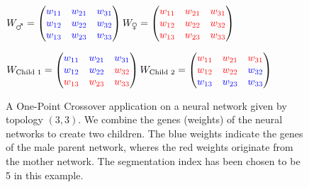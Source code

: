 \documentclass[10pt,a4paper,DIV=11]{scrreprt}
\begin{document}
\begin{figure}
    \begin{center}
        $
        W_{\mars} = 
        \begin{pmatrix}
        \textcolor{blue}{w_{11}} & \textcolor{blue}{w_{21}} & \textcolor{blue}{w_{31}} \\
        \textcolor{blue}{w_{12}} & \textcolor{blue}{w_{22}} & \textcolor{blue}{w_{32}} \\
        \textcolor{blue}{w_{13}} & \textcolor{blue}{w_{23}} & \textcolor{blue}{w_{33}} \\
        \end{pmatrix}
        W_{\female} = 
        \begin{pmatrix}
        \textcolor{red}{w_{11}} & \textcolor{red}{w_{21}} & \textcolor{red}{w_{31}} \\
        \textcolor{red}{w_{12}} & \textcolor{red}{w_{22}} & \textcolor{red}{w_{32}} \\
        \textcolor{red}{w_{13}} & \textcolor{red}{w_{23}} & \textcolor{red}{w_{33}} \\
        \end{pmatrix}
        $
            
        \end{center}

        \begin{center}
        $
        W_{\text{Child 1}} = 
        \begin{pmatrix}
        \textcolor{blue}{w_{11}} & \textcolor{blue}{w_{21}} & \textcolor{blue}{w_{31}} \\
        \textcolor{blue}{w_{12}} & \textcolor{blue}{w_{22}} & \textcolor{red}{w_{32}} \\
        \textcolor{red}{w_{13}} & \textcolor{red}{w_{23}} & \textcolor{red}{w_{33}} \\
        \end{pmatrix}
        W_{\text{Child 2}} = 
        \begin{pmatrix}
        \textcolor{red}{w_{11}} & \textcolor{red}{w_{21}} & \textcolor{red}{w_{31}} \\
        \textcolor{red}{w_{12}} & \textcolor{red}{w_{22}} & \textcolor{blue}{w_{32}} \\
        \textcolor{blue}{w_{13}} & \textcolor{blue}{w_{23}} & \textcolor{blue}{w_{33}} \\
        \end{pmatrix}
        $
    \end{center}

	\caption{A One-Point Crossover application on a neural network given by topology $(3,3)$. We combine the genes (weights) of the
neural networks to create two children. The blue weights indicate the genes of the male parent network, wheres the 
red weights originate from the mother network. The segmentation index has been chosen to be 5 in this example.}
	\label{fig:pitts1}
\end{figure}
\end{document}
